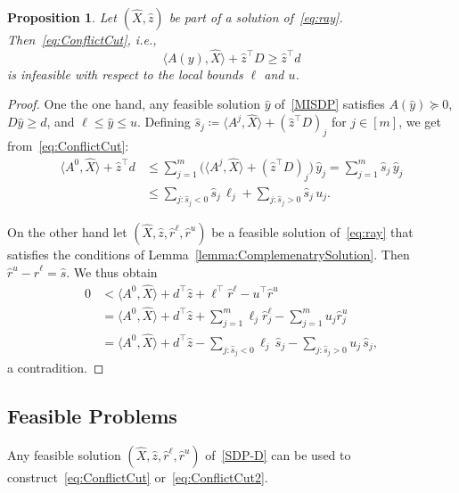 \documentclass[10pt, a4paper]{article}
\newcommand{\define}{\coloneqq}
\newcommand{\skal}[2]{\langle{#1},{#2}\rangle}
\newcommand{\T}{^{\top}}
\newtheorem{proposition}[theorem]{Proposition}
\begin{document}
\begin{proposition}
  Let $(\hat{X}, \hat{z})$ be part of a solution of~\eqref{eq:ray}. Then~\eqref{eq:ConflictCut}, i.e.,
  \[
    \skal{A(y)}{\hat{X}} + \hat{z}\T D \geq \hat{z}\T d
  \]
  is infeasible with respect to the local bounds $\ell$ and $u$.
\end{proposition}

\begin{proof}
  One the one hand, any feasible solution $\hat{y}$ of~\eqref{MISDP} satisfies
  $A(\hat{y}) \succeq 0$, $D \hat{y} \geq d$, and
  $\ell \leq \hat{y} \leq u$. Defining
  $\hat{s}_j \define \skal{A^j}{\hat{X}} + (\hat{z}\T D)_j$ for
  $j \in [m]$, we get from~\eqref{eq:ConflictCut}:
  \begin{align*}
    \skal{A^0}{\hat{X}} + \hat{z}\T d & \leq \sum_{j=1}^m \big(\skal{A^j}{\hat{X}} + (\hat{z}\T D)_j\big)\, \hat{y}_j
    = \sum_{j=1}^m \hat{s}_j\, \hat{y}_j\\
    & \leq \sum_{j: \hat{s}_j < 0} \hat{s}_j\, \ell_j +
        \sum_{j: \hat{s}_j > 0} \hat{s}_j\, u_j.
  \end{align*}

  On the other hand let $(\hat{X}, \hat{z}, \hat{r}^\ell, \hat{r}^u)$ be a
  feasible solution of~\eqref{eq:ray} that satisfies the conditions of
  Lemma~\ref{lemma:ComplemenatrySolution}. Then
  $\hat{r}^u - \hat{r}^\ell = \hat{s}$.  We thus obtain
  \begin{align*}
    0 & < \skal{A^0}{\hat{X}} + d\T \hat{z} + \ell\T \hat{r}^\ell - u\T \hat{r}^u\\
      & = \skal{A^0}{\hat{X}} + d\T \hat{z} + \sum_{j=1}^m \ell_j \hat{r}^\ell_j -
        \sum_{j=1}^m u_j \hat{r}^u_j\\
      & = \skal{A^0}{\hat{X}}  + d\T \hat{z} - \sum_{j: \hat{s}_j < 0} \ell_j\, \hat{s}_j -
        \sum_{j: \hat{s}_j > 0} u_j\, \hat{s}_j,
  \end{align*}
  a contradition.
\end{proof}

\subsection{Feasible Problems}

Any feasible solution $(\hat{X}, \hat{z}, \hat{r}^\ell, \hat{r}^u)$
of~\eqref{SDP-D} can be used to construct~\eqref{eq:ConflictCut}
or~\eqref{eq:ConflictCut2}.
\end{document}
